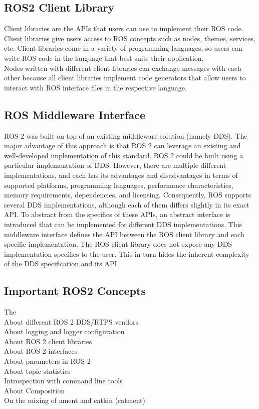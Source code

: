 	\subsection{ROS2 Client Library}
	\label{Grundlagen:ROS2:ROS2ClientLibrary}
	Client libraries are the APIs that users can use to implement their ROS code. Client libraries give users access to ROS concepts such as nodes, themes, services, etc. Client libraries come in a variety of programming languages, so users can write ROS code in the language that best suits their application.\\

	Nodes written with different client libraries can exchange messages with each other because all client libraries implement code generators that allow users to interact with ROS interface files in the respective language.

	\subsection{ROS Middleware Interface}
	\label{Grundlagen:ROS2:ROSMiddlewareInterface}
	ROS 2 was built on top of an existing middleware solution (namely DDS). The major advantage of this approach is that ROS 2 can leverage an existing and well-developed implementation of this standard. ROS 2 could be built using a particular implementation of DDS. However, there are multiple different implementations, and each has its advantages and disadvantages in terms of supported platforms, programming languages, performance characteristics, memory requirements, dependencies, and licensing. Consequently, ROS supports several DDS implementations, although each of them differs slightly in its exact API. To abstract from the specifics of these APIs, an abstract interface is introduced that can be implemented for different DDS implementations. This middleware interface defines the API between the ROS client library and each specific implementation. The ROS client library does not expose any DDS implementation specifics to the user. This in turn hides the inherent complexity of the DDS specification and its API.\cite{ros2OnMW}
	
	\subsection{Important ROS2 Concepts}
	\label{Grundlagen:ROS2:Concepts}

		
		The \\
		About different ROS 2 DDS/RTPS vendors\\	
		About logging and logger configuration\\
		About ROS 2 client libraries\\
		About ROS 2 interfaces\\
		About parameters in ROS 2\\
		About topic statistics\\
		Introspection with command line tools\\
		About Composition\\
		On the mixing of ament and catkin (catment)\\

